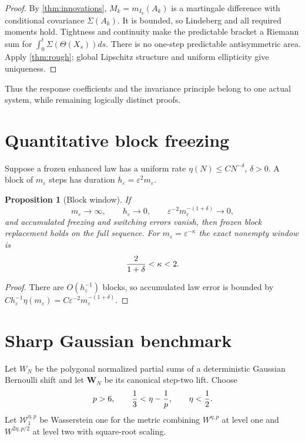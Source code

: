 \documentclass[11pt,reqno]{amsart}
\newtheorem{proposition}[theorem]{Proposition}
\theoremstyle{definition}
\theoremstyle{remark}
\begin{document}
\begin{proof}
By \cref{thm:innovations},
$M_k=m_{I_k}(A_k)$ is a martingale difference with conditional covariance
$\Sigma(A_k)$.  It is bounded, so Lindeberg and all required moments hold.
Tightness and continuity make the predictable bracket a Riemann sum for
$\int_0^t\Sigma(\Theta(X_s))ds$.  There is no one-step predictable
antisymmetric area.  Apply \cref{thm:rough}; global Lipschitz structure and
uniform ellipticity give uniqueness.
\end{proof}

Thus the response coefficients and the invariance principle belong to one
actual system, while remaining logically distinct proofs.

\section{Quantitative block freezing}\label{sec:block}
Suppose a frozen enhanced law has a uniform rate
$\eta(N)\le CN^{-\delta}$, $\delta>0$.  A block of $m_\varepsilon$ steps has
duration $h_\varepsilon=\varepsilon^2m_\varepsilon$.

\begin{proposition}[Block window]\label{prop:block}
If
\[
 m_\varepsilon\to\infty,
 \qquad h_\varepsilon\to0,
 \qquad
 \varepsilon^{-2}m_\varepsilon^{-(1+\delta)}\to0,
\]
and accumulated freezing and switching errors vanish, then frozen block
replacement holds on the full sequence.  For
$m_\varepsilon=\varepsilon^{-\kappa}$ the exact nonempty window is
\[
 {2\over1+\delta}<\kappa<2.
\]
\end{proposition}

\begin{proof}
There are $O(h_\varepsilon^{-1})$ blocks, so accumulated law error is bounded
by
$C h_\varepsilon^{-1}\eta(m_\varepsilon)
=C\varepsilon^{-2}m_\varepsilon^{-(1+\delta)}$.
\end{proof}

\section{Sharp Gaussian benchmark}\label{sec:Gaussian}
Let $W_N$ be the polygonal normalized partial sums of a deterministic Gaussian
Bernoulli shift and let $\mathbf W_N$ be its canonical step-two lift.  Choose
\[
 p>6,\qquad {1\over3}<\eta-{1\over p},\qquad\eta<{1\over2}.
\]
Let $\mathcal W_1^{\eta,p}$ be Wasserstein one for the metric combining
$W^{\eta,p}$ at level one and $W^{2\eta,p/2}$ at level two with square-root
scaling.
\end{document}
